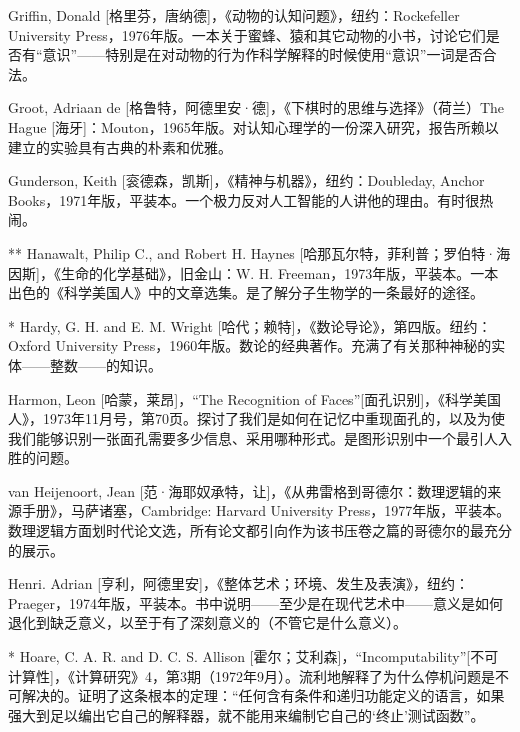 \begin{thebib}
\begin{biblist}
\item Griffin, Donald [格里芬，唐纳德]，《动物的认知问题》，纽约：Rockefeller University Press，1976年版。一本关于蜜蜂、猿和其它动物的小书，讨论它们是否有“意识”——特别是在对动物的行为作科学解释的时候使用“意识”一词是否合法。

\item Groot, Adriaan de [格鲁特，阿德里安·德]，《下棋时的思维与选择》（荷兰）The Hague [海牙]：Mouton，1965年版。对认知心理学的一份深入研究，报告所赖以建立的实验具有古典的朴素和优雅。

\item Gunderson, Keith [衮德森，凯斯]，《精神与机器》，纽约：Doubleday, Anchor Books，1971年版，平装本。一个极力反对人工智能的人讲他的理由。有时很热闹。

\item[**] Hanawalt, Philip C., and Robert H. Haynes [哈那瓦尔特，菲利普；罗伯特·海因斯]，《生命的化学基础》，旧金山：W. H. Freeman，1973年版，平装本。一本出色的《科学美国人》中的文章选集。是了解分子生物学的一条最好的途径。

\item[*] Hardy, G. H. and E. M. Wright [哈代；赖特]，《数论导论》，第四版。纽约：Oxford University Press，1960年版。数论的经典著作。充满了有关那种神秘的实体——整数——的知识。

\item Harmon, Leon [哈蒙，莱昂]，“The Recognition of Faces”[面孔识别]，《科学美国人》，1973年11月号，第70页。探讨了我们是如何在记忆中重现面孔的，以及为使我们能够识别一张面孔需要多少信息、采用哪种形式。是图形识别中一个最引人入胜的问题。

\item van Heijenoort, Jean [范·海耶奴承特，让]，《从弗雷格到哥德尔：数理逻辑的来源手册》，马萨诸塞，Cambridge: Harvard University Press，1977年版，平装本。数理逻辑方面划时代论文选，所有论文都引向作为该书压卷之篇的哥德尔的最充分的展示。

\item Henri. Adrian [亨利，阿德里安]，《整体艺术；环境、发生及表演》，纽约：Praeger，1974年版，平装本。书中说明——至少是在现代艺术中——意义是如何退化到缺乏意义，以至于有了深刻意义的（不管它是什么意义）。

\item[*] Hoare, C. A. R. and D. C. S. Allison [霍尔；艾利森]，“Incomputability”[不可计算性]，《计算研究》4，第3期（1972年9月）。流利地解释了为什么停机问题是不可解决的。证明了这条根本的定理：“任何含有条件和递归功能定义的语言，如果强大到足以编出它自己的解释器，就不能用来编制它自己的‘终止’测试函数”。


\end{biblist}
\end{thebib}
